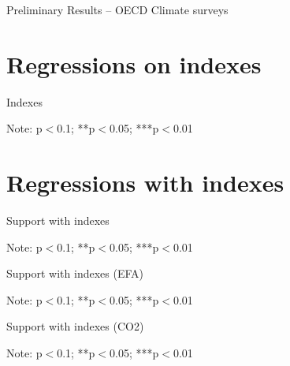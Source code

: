 \documentclass{article}
\begin{document}
\begin{LARGE}
	\begin{center}
		Preliminary Results – OECD Climate surveys	
	\end{center}
	
\end{LARGE}
	\tableofcontents
	\listoftables

\clearpage

\section{Regressions on indexes}


\begin{table}[h!]
	\caption{Indexes}
	\begin{center}
		\scalebox{0.7}{}
	\end{center}
	{\footnotesize Note: 
	\newline *p$<$0.1; **p$<$0.05; ***p$<$0.01}
\end{table}	

\section{Regressions with indexes}

\begin{table}[h!]
	\caption{Support with indexes}
	\begin{center}
		\scalebox{0.7}{}
	\end{center}
	{\footnotesize Note: 
	\newline *p$<$0.1; **p$<$0.05; ***p$<$0.01}
\end{table}	

\begin{table}[h!]
	\caption{Support with indexes (EFA)}
	\begin{center}
		\scalebox{0.7}{}
	\end{center}
	{\footnotesize Note: 
	\newline *p$<$0.1; **p$<$0.05; ***p$<$0.01}
\end{table}	

\begin{table}[h!]
	\caption{Support with indexes (CO2)}
	\begin{center}
		\scalebox{0.7}{}
	\end{center}
	{\footnotesize Note: 
	\newline *p$<$0.1; **p$<$0.05; ***p$<$0.01}
\end{table}	
\end{document}
